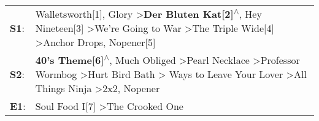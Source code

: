 \begin{supertabular}{p{0.03\textwidth}p{0.92\textwidth}}
 \textbf{S1}:  &                                                                    Walletsworth[1]\textsuperscript{}, \enspace Glory\textsuperscript{} \textgreater \enspace \textbf{Der Bluten Kat[2]\textsuperscript{$\wedge$}}, \enspace Hey Nineteen[3]\textsuperscript{} \textgreater \enspace We're Going to War\textsuperscript{} \textgreater \enspace The Triple Wide[4]\textsuperscript{} \textgreater \enspace Anchor Drops\textsuperscript{}, \enspace Nopener[5]\textsuperscript{}  \enspace  \\
 \textbf{S2}:  &  \textbf{40's Theme[6]\textsuperscript{$\wedge$}}, \enspace Much Obliged\textsuperscript{} \textgreater \enspace Pearl Necklace\textsuperscript{} \textgreater \enspace Professor Wormbog\textsuperscript{} \textgreater \enspace Hurt Bird Bath\textsuperscript{} \textgreater {} Ways to Leave Your Lover\textsuperscript{} \textgreater \enspace All Things Ninja\textsuperscript{} \textgreater \enspace 2x2\textsuperscript{}, \enspace Nopener\textsuperscript{}  \enspace  \\
 \textbf{E1}:  &                                                                                                                                                                                                                                                                                                                                                                                        Soul Food I[7]\textsuperscript{} \textgreater \enspace The Crooked One\textsuperscript{}  \enspace  \\
\end{supertabular}
